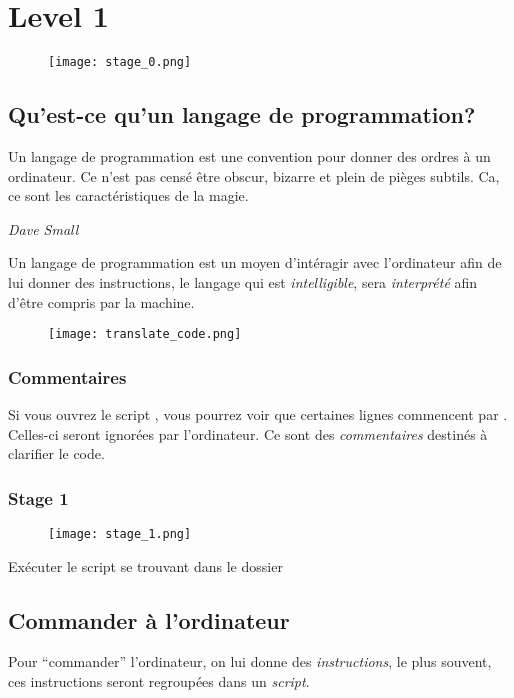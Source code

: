 \chapter{Level 1}
\begin{figure}[ht]
\texttt{[image: stage\_0.png]} 
\end{figure}

\section{Qu’est-ce qu’un langage de programmation?}

\epigraph{Un langage de programmation est une convention pour donner des ordres à un ordinateur. Ce n’est pas censé être obscur, bizarre et plein de pièges subtils.
Ca, ce sont les caractéristiques de la magie.}{\textit{Dave Small}}

Un langage de programmation est un moyen d’intéragir avec l’ordinateur afin de lui donner des instructions, le langage qui est \emph{intelligible}, 
sera \emph{interprété} afin d’être compris par la machine.

\begin{figure}[ht]
\centering
\texttt{[image: translate\_code.png]} 
\end{figure}

\subsection{Commentaires}

Si vous ouvrez le script , vous pourrez voir que certaines lignes commencent par \codeintext{\#}. Celles-ci seront ignorées par l'ordinateur. Ce sont des \emph{commentaires} destinés à clarifier le code.

\subsection{Stage 1}
\begin{figure}[ht]
\texttt{[image: stage\_1.png]} 
\end{figure}

Exécuter le script se trouvant dans le dossier 

\section{Commander à l'ordinateur}

Pour ``commander'' l’ordinateur, on lui donne des \emph{instructions}, le plus souvent, ces instructions seront regroupées dans un \emph{script}.

